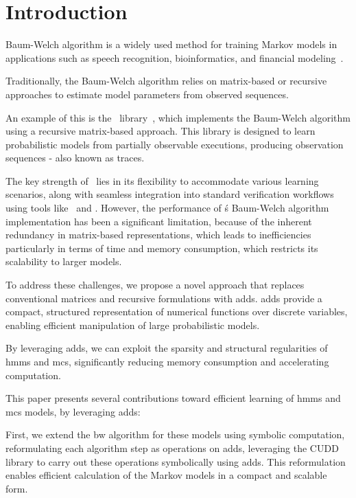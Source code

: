 
\section{Introduction}\label{sec:introduction}
 Baum-Welch algorithm is a widely used method for training Markov models in applications such as speech recognition, bioinformatics, and financial modeling~\cite{chavan2013overview,ciocchetta2009bio,mamon2007hidden}.

Traditionally, the Baum-Welch algorithm relies on matrix-based or recursive approaches to estimate model parameters from observed sequences.

An example of this is the \Jajapy\ library~\cite{ReynouardIB23}, which implements the Baum-Welch algorithm using a recursive matrix-based approach.
This library is designed to learn probabilistic models from partially observable executions, producing observation sequences - also known as traces.

The key strength of \Jajapy\ lies in its flexibility to accommodate various learning scenarios, along with seamless integration into standard verification workflows using tools like \Storm\ and \Prism.
However, the performance of \Jajapy\'s Baum-Welch algorithm implementation has been a significant limitation, because of the inherent redundancy in matrix-based representations, which leads to inefficiencies particularly in terms of time and memory consumption, which restricts its scalability to larger models.

To address these challenges, we propose a novel approach that replaces conventional matrices and recursive formulations with \glspl{add}.
\glspl{add} provide a compact, structured representation of numerical functions over discrete variables, enabling efficient manipulation of large probabilistic models.

By leveraging \glspl{add}, we can exploit the sparsity and structural regularities of \glspl{hmm} and \glspl{mc}, significantly reducing memory consumption and accelerating computation.

This paper presents several contributions toward efficient learning of \glspl{hmm} and \glspl{mc} models, by leveraging \glspl{add}:

First, we extend the \gls{bw} algorithm for these models using symbolic computation, reformulating each algorithm step as operations on \glspl{add}, leveraging the CUDD library to carry out these operations symbolically using \glspl{add}.
This reformulation enables efficient calculation of the Markov models in a compact and scalable form.

